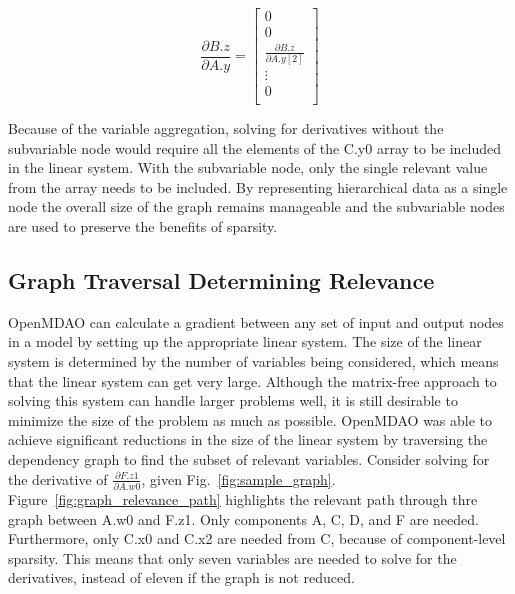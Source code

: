 \documentclass[]{aiaa-tc} %
\begin{document}
    \begin{equation}
        \frac{\partial B.z}{\partial A.y} =
        \begin{bmatrix}
            0 \\
            0 \\
            \frac{\partial B.z}{\partial A.y[2]} \\
            \vdots \\
            0 \\
        \end{bmatrix}
        \label{eqn:sparse_gradient}
    \end{equation}

    Because of the variable aggregation, solving for derivatives without the subvariable node would require
    all the elements of the C.y0 array to be included in the linear system.
    With the subvariable node, only the single relevant value from the array needs to be included.
    By representing hierarchical data as a single node the overall size of the graph
    remains manageable and the subvariable nodes are used to preserve the benefits of sparsity.


    \subsection{Graph Traversal Determining Relevance}
    \label{sec:determing relevance}

        OpenMDAO can calculate a gradient between any set of input and output nodes in a
        model by setting up the appropriate linear system. The size of the linear system
        is determined by the number of variables being considered, which means that the linear
        system can get very large. Although the matrix-free approach to solving this system
        can handle larger problems well, it is still desirable to minimize the size of the problem
        as much as possible. OpenMDAO was able to achieve significant reductions in the
        size of the linear system by traversing the dependency graph to find the subset of relevant variables.
        Consider solving for the derivative of $\frac{\partial F.z1}{\partial A.w0}$, given Fig.~\ref{fig:sample_graph}.
        Figure~\ref{fig:graph_relevance_path} highlights the relevant path through thre graph between A.w0 and F.z1.
        Only components A, C, D, and F are needed. Furthermore, only C.x0 and C.x2 are needed from C, because of component-level sparsity.
        This means that only seven variables are needed to solve for the derivatives,
        instead of eleven if the graph is not reduced.
\end{document}

